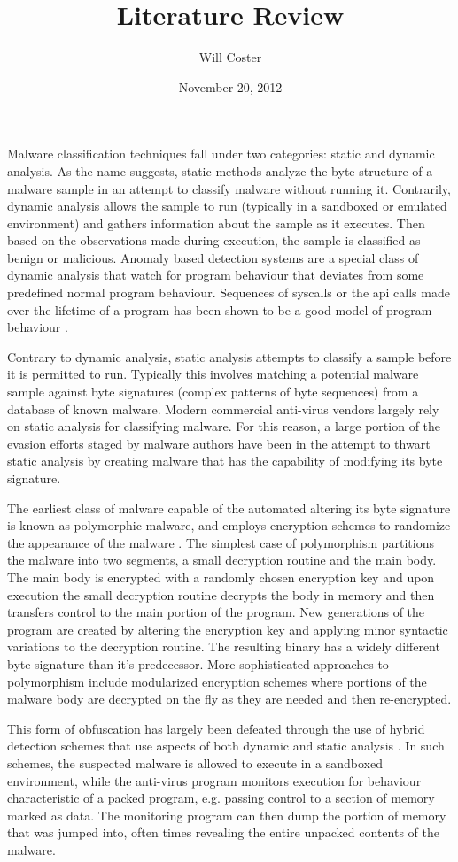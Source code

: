 \documentclass[finalcopy,short]{srpaper}
\title{Literature Review}
\author{Will Coster}
\date{November 20, 2012}
\begin{document}
  \frontmatter

  Malware classification techniques fall under two categories: static and
  dynamic analysis. As the name suggests, static methods analyze the byte
  structure of a malware sample in an attempt to classify malware without
  running it. Contrarily, dynamic analysis allows the sample to run (typically
  in a sandboxed or emulated environment) and gathers information about the
  sample as it executes. Then based on the observations made during execution,
  the sample is classified as benign or malicious.  Anomaly based detection
  systems are a special class of dynamic analysis that watch for program
  behaviour that deviates from some predefined normal program behaviour.
  Sequences of syscalls or the api calls made over the lifetime of a program has
  been shown to be a good model of program behaviour \cite{api_calls}.

  Contrary to dynamic analysis, static analysis attempts to classify a sample
  before it is permitted to run. Typically this involves matching a potential
  malware sample against byte signatures (complex patterns of byte sequences)
  from a database of known malware.  Modern commercial anti-virus vendors
  largely rely on static analysis for classifying malware. For this reason, a
  large portion of the evasion efforts staged by malware authors have been in
  the attempt to thwart static analysis by creating malware that has the
  capability of modifying its byte signature.
  
  The earliest class of malware capable of the automated altering its byte
  signature is known as polymorphic malware, and employs encryption schemes to
  randomize the appearance of the malware \cite{simile}.  The simplest case of
  polymorphism partitions the malware into two segments, a small decryption
  routine and the main body. The main body is encrypted with a randomly chosen
  encryption key and upon execution the small decryption routine decrypts the
  body in memory and then transfers control to the main portion of the program.
  New generations of the program are created by altering the encryption key and
  applying minor syntactic variations to the decryption routine. The resulting
  binary has a widely different byte signature than it's predecessor.  More
  sophisticated approaches to polymorphism include modularized encryption
  schemes where portions of the malware body are decrypted on the fly as they
  are needed and then re-encrypted.

  This form of obfuscation has largely been defeated through the use of hybrid
  detection schemes that use aspects of both dynamic and static analysis
  \cite{polyunpack}.  In such schemes, the suspected malware is allowed to
  execute in a sandboxed environment, while the anti-virus program monitors
  execution for behaviour characteristic of a packed program, e.g. passing
  control to a section of memory marked as data. The monitoring program can then
  dump the portion of memory that was jumped into, often times revealing the
  entire unpacked contents of the malware.
\end{document}
